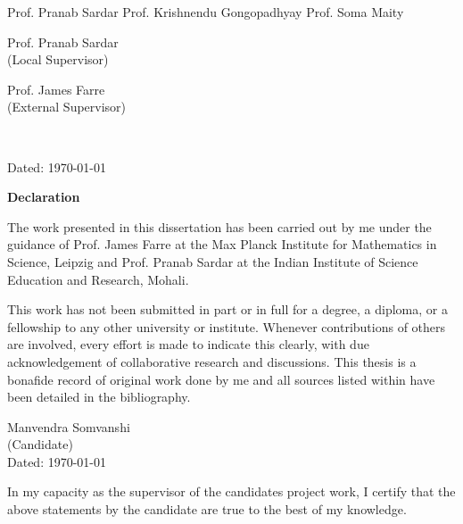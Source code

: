 \documentclass[a4paper, 12pt, twoside]{report}
\theoremstyle{plain}
\theoremstyle{definition}
\theoremstyle{remark}
\begin{document}
\vspace{4cm}

Prof. Pranab Sardar \hfill Prof. Krishnendu Gongopadhyay \hfill Prof. Soma Maity

\vspace{4cm}

  \begin{minipage}{3.75cm}
    Prof. Pranab Sardar
    \\
    (Local Supervisor)
  \end{minipage}
  \hfill
  \begin{minipage}{3.90cm}
    Prof. James Farre
    \\
    (External Supervisor)
  \end{minipage}\\

\vspace{4cm}
\begin{flushright}
Dated: \today
\end{flushright}

\cleardoublepage

\begin{center}
    \textbf{\Large Declaration}
\end{center}
The work presented in this dissertation has been carried out by me under the guidance of Prof. James Farre at the Max Planck Institute for Mathematics in Science, Leipzig and Prof. Pranab Sardar at the Indian Institute of Science Education and Research, Mohali.

\vspace{0.4cm}

This work has not been submitted in part or in full for a degree, a diploma, or a fellowship to any other university or institute. Whenever contributions of others are involved, every effort is made to indicate this clearly, with due acknowledgement of collaborative research and discussions. This thesis is a bonafide record of original work done by me and all sources listed within have been detailed in the bibliography.

\vspace{2cm}

\begin{flushright}
Manvendra Somvanshi
\\
(Candidate)
\\
Dated: \today
\end{flushright}

In my capacity as the supervisor of the candidates project work, I certify that the above statements by the candidate are true to the best of my knowledge.
\end{document}
